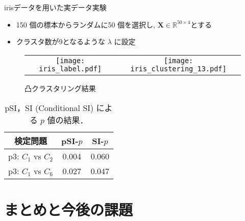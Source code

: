 \documentclass[dvipdfmx, 10pt]{beamer}
\begin{document}


\begin{frame}{irisデータを用いた実データ実験}
    \begin{itemize}
        \item 150 個の標本からランダムに50 個を選択し, $\bm{X} \in \mathbb{R}^{50 \times 4}$とする
        \item クラスタ数が9となるような $\lambda$ に設定
    \end{itemize}
    \begin{figure}[htb]
        \begin{tabular}{cc}
        \begin{minipage}[t]{0.45\hsize}
            \centering
            \texttt{[image: iris\_label.pdf]}
            \caption{$\bm{X}$の分布}
        \end{minipage} &
        \begin{minipage}[t]{0.45\hsize}
            \centering
            \texttt{[image: iris\_clustering\_13.pdf]}
            \caption{凸クラスタリング結果}
        \end{minipage}
        \end{tabular}
    \end{figure}
    \begin{table}[tb]
        \centering
        \caption{pSI，SI (Conditional SI) による $p$ 値の結果．}
        \begin{tabular}{|c|c|c|} \hline
          検定問題 & pSI-$p$ & SI-$p$ \\\hline
          p3: $C_{1}$ vs $C_{2}$ & \alert{0.004} & 0.060 \\\hline
          p3: $C_{1}$ vs $C_{6}$ & \alert{0.027} & \alert{0.047} \\\hline
        \end{tabular}
        \label{tab:iris_p}
    \end{table}
\end{frame}


\section{まとめと今後の課題}

\end{document}
